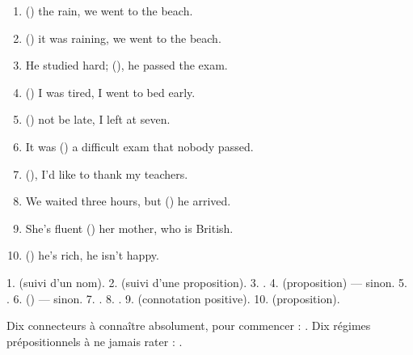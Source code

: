 \begin{exo}
\begin{enumerate}\setlength{\itemsep}{2pt}
  \item () the rain, we went to the beach.
  \item () it was raining, we went to the beach.
  \item He studied hard; (), he passed the exam.
  \item () I was tired, I went to bed early.
  \item () not be late, I left at seven.
  \item It was () a difficult exam that nobody passed.
  \item (), I'd like to thank my teachers.
  \item We waited three hours, but () he arrived.
  \item She's fluent () her mother, who is British.
  \item () he's rich, he isn't happy.
\end{enumerate}
\end{exo}
\begin{corrige}[D.2]
1.  (suivi d'un nom). 2.  (suivi d'une proposition).
3. . 4.  (proposition) ---  sinon.
5. . 6.  () ---  sinon.
7. . 8. . 9.  (connotation positive).
10.  (proposition).
\end{corrige}

\begin{memo}
Dix connecteurs à connaître absolument, pour commencer : .
Dix régimes prépositionnels à ne jamais rater : .
\end{memo}
